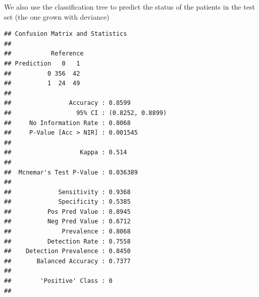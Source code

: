 \documentclass[10pt,ignorenonframetext,]{beamer}
\newenvironment{Shaded}{\begin{snugshade}}{\end{snugshade}}
\newcommand{\KeywordTok}[1]{\textcolor[rgb]{0.13,0.29,0.53}{\textbf{#1}}}
\newcommand{\DataTypeTok}[1]{\textcolor[rgb]{0.13,0.29,0.53}{#1}}
\newcommand{\StringTok}[1]{\textcolor[rgb]{0.31,0.60,0.02}{#1}}
\newcommand{\OperatorTok}[1]{\textcolor[rgb]{0.81,0.36,0.00}{\textbf{#1}}}
\newcommand{\NormalTok}[1]{#1}
\begin{document}
\begin{frame}[fragile]

We also use the classification tree to predict the status of the
patients in the test set (the one grown with deviance)

\tiny

\begin{Shaded}
\end{Shaded}

\begin{verbatim}
## Confusion Matrix and Statistics
## 
##           Reference
## Prediction   0   1
##          0 356  42
##          1  24  49
##                                           
##                Accuracy : 0.8599          
##                  95% CI : (0.8252, 0.8899)
##     No Information Rate : 0.8068          
##     P-Value [Acc > NIR] : 0.001545        
##                                           
##                   Kappa : 0.514           
##                                           
##  Mcnemar's Test P-Value : 0.036389        
##                                           
##             Sensitivity : 0.9368          
##             Specificity : 0.5385          
##          Pos Pred Value : 0.8945          
##          Neg Pred Value : 0.6712          
##              Prevalence : 0.8068          
##          Detection Rate : 0.7558          
##    Detection Prevalence : 0.8450          
##       Balanced Accuracy : 0.7377          
##                                           
##        'Positive' Class : 0               
## 
\end{verbatim}

\end{frame}
\end{document}
